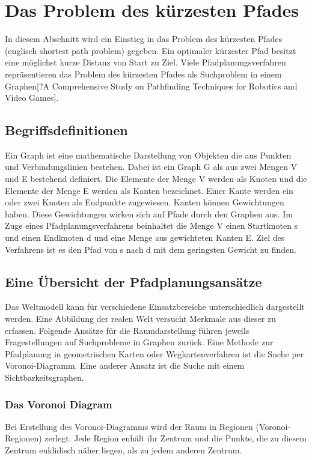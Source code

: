 \chapter{Das Problem des kürzesten Pfades}

In diesem Abschnitt wird ein Einstieg in das Problem des kürzesten Pfades (englisch shortest path problem) gegeben. Ein optimaler kürzester Pfad besitzt eine möglichst kurze Distanz von Start zu Ziel\cite{Madkour.2017}. Viele Pfadplanungsverfahren repräsentieren das Problem des kürzesten Pfades als Suchproblem in einem Graphen[?A Comprehensive Study on Pathfinding Techniques for Robotics and Video Games].

\section{Begriffsdefinitionen}

Ein Graph ist eine mathematische Darstellung von Objekten die aus Punkten und Verbindungslinien bestehen. Dabei ist ein Graph G als aus zwei Mengen V und E bestehend definiert. Die Elemente der Menge V werden als Knoten und die Elemente der Menge E werden als Kanten bezeichnet. Einer Kante werden ein oder zwei Knoten als Endpunkte zugewiesen. Kanten können Gewichtungen haben. Diese Gewichtungen wirken sich auf Pfade durch den Graphen aus\cite{Gross.2004}. Im Zuge eines Pfadplanungsverfahrens beinhaltet die Menge V einen Startknoten s und einen Endknoten d und eine Menge aus gewichteten Kanten E. Ziel des Verfahrens ist es den Pfad von s nach d mit dem geringsten Gewicht zu finden\cite{Madkour.2017}. 

\section{Eine Übersicht der Pfadplanungsansätze}

Das Weltmodell kann für verschiedene Einsatzbereiche unterschiedlich dargestellt werden. Eine Abbildung der realen Welt versucht Merkmale aus dieser zu erfassen.  Folgende Ansätze für die Raumdarstellung führen jeweils Fragestellungen auf Suchprobleme in Graphen zurück.
Eine Methode zur Pfadplanung in geometrischen Karten oder Wegkartenverfahren ist die Suche per Voronoi-Diagramm. Eine anderer Ansatz ist die Suche mit einem Sichtbarkeitsgraphen.
\subsection{Das Voronoi Diagram}
 Bei Erstellung des Voronoi-Diagramms wird der Raum in Regionen (Voronoi-Regionen) zerlegt. Jede Region enhält ihr Zentrum und die Punkte, die zu diesem Zentrum euklidisch näher liegen, als zu jedem anderen Zentrum. \cite{voronoi}

